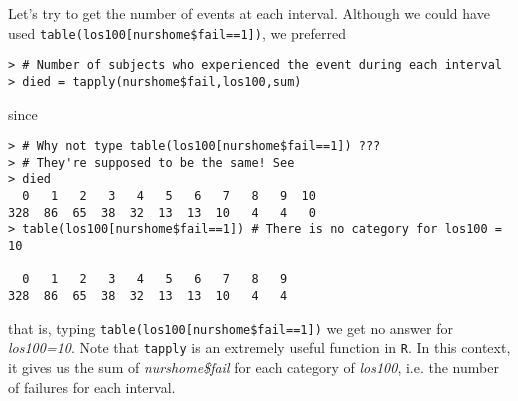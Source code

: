 \begin{enumerate}[(a)]
Let's try to get the number of events at each interval. Although we could have used \verb|table(los100[nurshome$fail==1])|, we preferred 
\begin{spacing}{1.2}
\begin{footnotesize}
\begin{verbatim}
> # Number of subjects who experienced the event during each interval
> died = tapply(nurshome$fail,los100,sum)
\end{verbatim}
\end{footnotesize}
\end{spacing} 
since
\begin{spacing}{1.2}
\begin{footnotesize}
\begin{verbatim}
> # Why not type table(los100[nurshome$fail==1]) ???
> # They're supposed to be the same! See
> died
  0   1   2   3   4   5   6   7   8   9  10 
328  86  65  38  32  13  13  10   4   4   0 
> table(los100[nurshome$fail==1]) # There is no category for los100 = 10

  0   1   2   3   4   5   6   7   8   9 
328  86  65  38  32  13  13  10   4   4 
\end{verbatim}
\end{footnotesize}
\end{spacing}
that is, typing \verb|table(los100[nurshome$fail==1])| we get no answer for \emph{los100=10}. Note that \verb|tapply| is an extremely useful function in \verb|R|. In this context, it gives us the sum of \emph{nurshome\$fail} for each category of \emph{los100}, i.e. the number of failures for each interval.


\end{enumerate}
